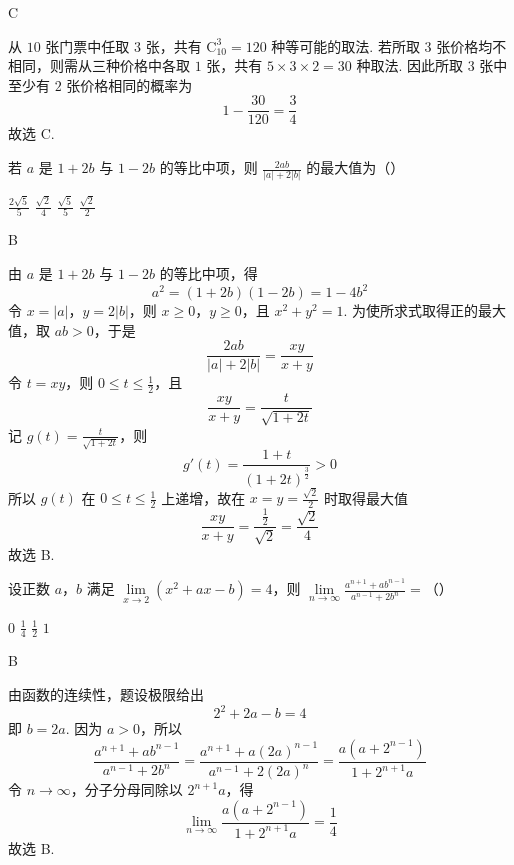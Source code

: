 \begin{answer}
C
\end{answer}

\begin{solution}
从 \(10\) 张门票中任取 \(3\) 张，共有 \(\mathrm C_{10}^{3}=120\) 种等可能的取法. 若所取 \(3\) 张价格均不相同，则需从三种价格中各取 \(1\) 张，共有 \(5\times3\times2=30\) 种取法. 因此所取 \(3\) 张中至少有 \(2\) 张价格相同的概率为
\[
1-\frac{30}{120}=\frac34
\]
故选 C.
\end{solution}

\begin{problem}
若 \(a\) 是 \(1 + 2b\) 与 \(1 - 2b\) 的等比中项，则 \(\frac{2ab}{|a| + 2|b|}\) 的最大值为（\quad）

\choices
    {\(\frac{2\sqrt{5}}{5}\)}
    {\(\frac{\sqrt{2}}{4}\)}
    {\(\frac{\sqrt{5}}{5}\)}
    {\(\frac{\sqrt{2}}{2}\)}
\end{problem}

\begin{answer}
B
\end{answer}

\begin{solution}
由 \(a\) 是 \(1+2b\) 与 \(1-2b\) 的等比中项，得
\[
a^2=(1+2b)(1-2b)=1-4b^2
\]
令 \(x=|a|\)，\(y=2|b|\)，则 \(x\geqslant0\)，\(y\geqslant0\)，且 \(x^2+y^2=1\). 为使所求式取得正的最大值，取 \(ab>0\)，于是
\[
\frac{2ab}{|a|+2|b|}=\frac{xy}{x+y}
\]
令 \(t=xy\)，则 \(0\leqslant t\leqslant\frac12\)，且
\[
\frac{xy}{x+y}=\frac{t}{\sqrt{1+2t}}
\]
记 \(g(t)=\frac{t}{\sqrt{1+2t}}\)，则
\[
g'(t)=\frac{1+t}{(1+2t)^{\frac32}}>0
\]
所以 \(g(t)\) 在 \(0\leqslant t\leqslant\frac12\) 上递增，故在 \(x=y=\frac{\sqrt2}{2}\) 时取得最大值
\[
\frac{xy}{x+y}=\frac{\frac12}{\sqrt2}=\frac{\sqrt2}{4}
\]
故选 B.
\end{solution}

\begin{problem}
设正数 \(a\)，\(b\) 满足 \(\displaystyle \lim\limits_{x \to 2} \left(x^{2} + ax - b\right) = 4\)，则 \(\displaystyle \lim\limits_{n \to \infty} \frac{a^{n+1} + ab^{n-1}}{a^{n-1} + 2b^n} =\)（\quad）

\choices
    {\(0\)}
    {\( \frac{1}{4} \)}
    {\( \frac{1}{2} \)}
    {\(1\)}
\end{problem}

\begin{answer}
B
\end{answer}

\begin{solution}
由函数的连续性，题设极限给出
\[
2^2+2a-b=4
\]
即 \(b=2a\). 因为 \(a>0\)，所以
\[
\frac{a^{n+1}+ab^{n-1}}{a^{n-1}+2b^n}
=\frac{a^{n+1}+a(2a)^{n-1}}{a^{n-1}+2(2a)^n}
=\frac{a(a+2^{n-1})}{1+2^{n+1}a}
\]
令 \(n\to\infty\)，分子分母同除以 \(2^{n+1}a\)，得
\[
\lim_{n\to\infty}\frac{a(a+2^{n-1})}{1+2^{n+1}a}=\frac14
\]
故选 B.
\end{solution}

